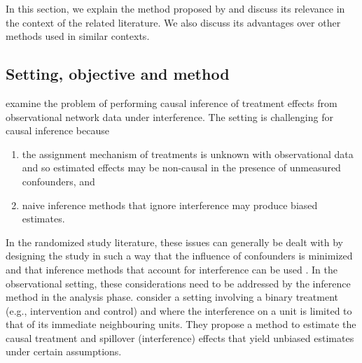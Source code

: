 \documentclass[10pt]{article}
\begin{document}
\todo In this section, we explain the method proposed by \textcite{Forastiere:2021} and discuss its relevance in the context of the related literature. We also discuss its advantages over other methods used in similar contexts.

\subsection{Setting, objective and method}\label{sec:method}

\textcite{Forastiere:2021} examine the problem of performing causal inference of treatment effects from observational network data under interference. The setting is challenging for causal inference because
\begin{enumerate}
\item
the assignment mechanism of treatments is unknown with observational data and so estimated effects may be non-causal in the presence of unmeasured confounders, and
\item
naive inference methods that ignore interference may produce biased estimates.
\end{enumerate}
In the randomized study literature, these issues can generally be dealt with by designing the study in such a way that the influence of confounders is minimized and that inference methods that account for interference can be used \parencite[e.g.,][]{Saveski:2017,Jagadeesan:2020,Imai:2021,Doudchenko:2020}. In the observational setting, these considerations need to be addressed by the inference method in the analysis phase. \citeauthor{Forastiere:2021} consider a setting involving a binary treatment (e.g., intervention and control) and where the interference on a unit is limited to that of its immediate neighbouring units. They propose a method to estimate the causal treatment and spillover (interference) effects that yield unbiased estimates under certain assumptions.
\\
\end{document}
